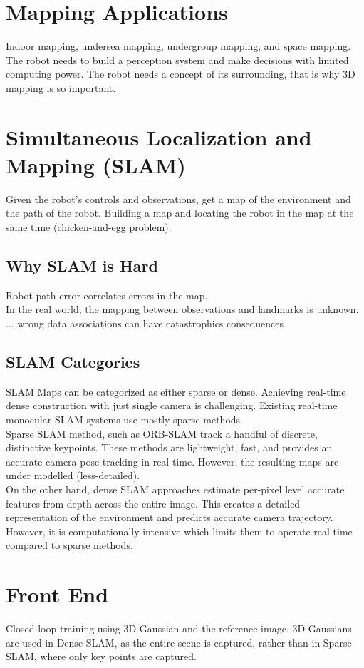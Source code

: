 \documentclass[11pt, oneside]{book}
\begin{document}
\section{Mapping Applications}
Indoor mapping, undersea mapping, undergroup mapping, and space mapping. The robot needs to build a perception system and make decisions with limited 
computing power. The robot needs a concept of its surrounding, that is why 3D mapping is so important.
\section{Simultaneous Localization and Mapping (SLAM)}
Given the robot's controls and observations, get a map of the environment and the path of the robot. Building a map and locating the robot in the map at the same time (chicken-and-egg problem).
\subsection{Why SLAM is Hard}
Robot path error correlates errors in the map. \\ 

\noindent In the real world, the mapping between observations and landmarks is unknown. $\dots$ wrong data associations can have catastrophics consequences


\subsection{SLAM Categories}
SLAM Maps can be categorized as either sparse or dense. Achieving real-time dense construction with just single camera is challenging. Existing real-time monocular SLAM systems use mostly sparse methods. \\ 

\noindent Sparse SLAM method, such as ORB-SLAM track a handful of discrete, distinctive keypoints. These methods are lightweight, fast, and provides an accurate camera pose tracking in real time. However, the resulting maps are under modelled (less-detailed). \\

\noindent On the other hand, dense SLAM approaches estimate per-pixel level accurate features from depth across the entire image. This creates a detailed representation of the environment and predicts accurate camera trajectory. However, it is computationally intensive which limits them to operate real time compared to sparse methods.

\section{Front End}
Closed-loop training using 3D Gaussian and the reference image. 3D Gaussians are used in Dense SLAM, as the entire scene is captured, rather than in Sparse SLAM, where only key points are captured. \\ 
\end{document}
